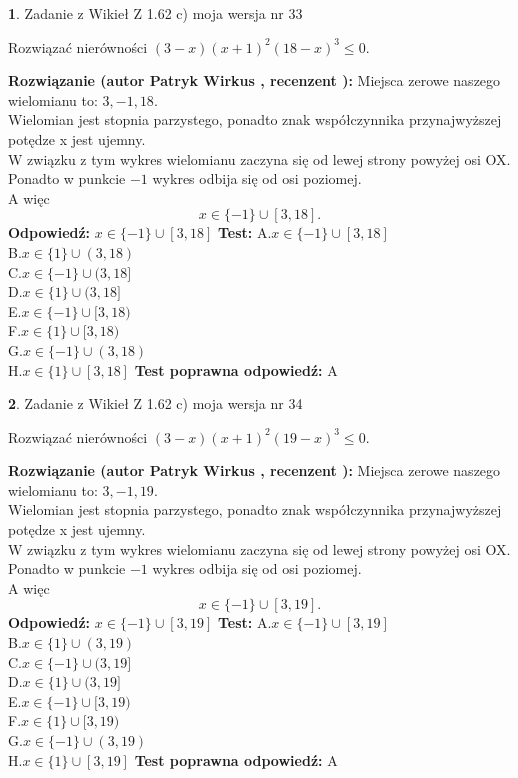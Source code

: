 \documentclass[12pt, a4paper]{article}
\theoremstyle{definition} %
\newtheorem{zad}{}
\newcommand{\zadStart}[1]{\begin{zad}#1\newline}
\newcommand{\zadStop}{\end{zad}}
\newcommand{\rozwStart}[2]{\noindent \textbf{Rozwiązanie (autor #1 , recenzent #2): }\newline}
\newcommand{\rozwStop}{\newline}
\newcommand{\odpStart}{\noindent \textbf{Odpowiedź:}\newline}
\newcommand{\odpStop}{\newline}
\newcommand{\testStart}{\noindent \textbf{Test:}\newline}
\newcommand{\testStop}{\newline}
\newcommand{\kluczStart}{\noindent \textbf{Test poprawna odpowiedź:}\newline}
\newcommand{\kluczStop}{\newline}
\begin{document}
\zadStart{Zadanie z Wikieł Z 1.62 c) moja wersja nr 33}

Rozwiązać nierówności $(3-x)(x+1)^{2}(18-x)^{3}\le0$.
\zadStop
\rozwStart{Patryk Wirkus}{}
Miejsca zerowe naszego wielomianu to: $3, -1, 18$.\\
Wielomian jest stopnia parzystego, ponadto znak współczynnika przy\linebreak najwyższej potędze x jest ujemny.\\ W związku z tym wykres wielomianu zaczyna się od lewej strony powyżej osi OX.\\
Ponadto w punkcie $-1$ wykres odbija się od osi poziomej.\\
A więc $$x \in \{-1\} \cup [3,18].$$
\rozwStop
\odpStart
$x \in \{-1\} \cup [3,18]$
\odpStop
\testStart
A.$x \in \{-1\} \cup [3,18]$\\
B.$x \in \{1\} \cup (3,18)$\\
C.$x \in \{-1\} \cup (3,18]$\\
D.$x \in \{1\} \cup (3,18]$\\
E.$x \in \{-1\} \cup [3,18)$\\
F.$x \in \{1\} \cup [3,18)$\\
G.$x \in \{-1\} \cup (3,18)$\\
H.$x \in \{1\} \cup [3,18]$
\testStop
\kluczStart
A
\kluczStop



\zadStart{Zadanie z Wikieł Z 1.62 c) moja wersja nr 34}

Rozwiązać nierówności $(3-x)(x+1)^{2}(19-x)^{3}\le0$.
\zadStop
\rozwStart{Patryk Wirkus}{}
Miejsca zerowe naszego wielomianu to: $3, -1, 19$.\\
Wielomian jest stopnia parzystego, ponadto znak współczynnika przy\linebreak najwyższej potędze x jest ujemny.\\ W związku z tym wykres wielomianu zaczyna się od lewej strony powyżej osi OX.\\
Ponadto w punkcie $-1$ wykres odbija się od osi poziomej.\\
A więc $$x \in \{-1\} \cup [3,19].$$
\rozwStop
\odpStart
$x \in \{-1\} \cup [3,19]$
\odpStop
\testStart
A.$x \in \{-1\} \cup [3,19]$\\
B.$x \in \{1\} \cup (3,19)$\\
C.$x \in \{-1\} \cup (3,19]$\\
D.$x \in \{1\} \cup (3,19]$\\
E.$x \in \{-1\} \cup [3,19)$\\
F.$x \in \{1\} \cup [3,19)$\\
G.$x \in \{-1\} \cup (3,19)$\\
H.$x \in \{1\} \cup [3,19]$
\testStop
\kluczStart
A
\kluczStop
\end{document}
